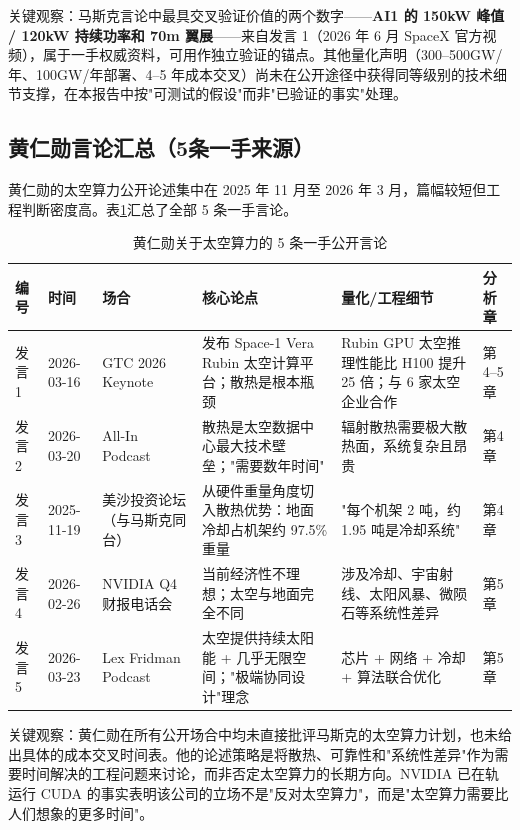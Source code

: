 关键观察：马斯克言论中最具交叉验证价值的两个数字——\textbf{AI1 的 150\;kW 峰值 / 120\;kW 持续功率和 70\;m 翼展}——来自发言 1（2026 年 6 月 SpaceX 官方视频），属于一手权威资料，可用作独立验证的锚点\cite{spacex2026ai1}。其他量化声明（300--500\;GW/年、100\;GW/年部署、4--5 年成本交叉）尚未在公开途径中获得同等级别的技术细节支撑，在本报告中按"可测试的假设"而非"已验证的事实"处理。

\subsection{黄仁勋言论汇总（5条一手来源）}

黄仁勋的太空算力公开论述集中在 2025 年 11 月至 2026 年 3 月，篇幅较短但工程判断密度高。表\ref{tab:huang_statements}汇总了全部 5 条一手言论。

\begin{table}[H]
\centering
\caption{黄仁勋关于太空算力的 5 条一手公开言论}
\label{tab:huang_statements}
\footnotesize
\begin{tabular}{p{0.7cm}p{1.5cm}p{1.5cm}p{3.8cm}p{2.8cm}p{1.2cm}}
\toprule
\textbf{编号} & \textbf{时间} & \textbf{场合} & \textbf{核心论点} & \textbf{量化/工程细节} & \textbf{分析章} \\
\midrule
发言1 & 2026-03-16 & GTC 2026 Keynote & 发布 Space-1 Vera Rubin 太空计算平台；散热是根本瓶颈 & Rubin GPU 太空推理性能比 H100 提升 25 倍；与 6 家太空企业合作 & 第4--5章 \\
\hline
发言2 & 2026-03-20 & All-In Podcast & 散热是太空数据中心最大技术壁垒；"需要数年时间" & 辐射散热需要极大散热面，系统复杂且昂贵 & 第4章 \\
\hline
发言3 & 2025-11-19 & 美沙投资论坛（与马斯克同台） & 从硬件重量角度切入散热优势：地面冷却占机架约 97.5\% 重量 & "每个机架 2 吨，约 1.95 吨是冷却系统" & 第4章 \\
\hline
发言4 & 2026-02-26 & NVIDIA Q4 财报电话会 & 当前经济性不理想；太空与地面完全不同 & 涉及冷却、宇宙射线、太阳风暴、微陨石等系统性差异 & 第5章 \\
\hline
发言5 & 2026-03-23 & Lex Fridman Podcast & 太空提供持续太阳能 + 几乎无限空间；"极端协同设计"理念 & 芯片 + 网络 + 冷却 + 算法联合优化 & 第5章 \\
\bottomrule
\end{tabular}
\end{table}

关键观察：黄仁勋在所有公开场合中均未直接批评马斯克的太空算力计划，也未给出具体的成本交叉时间表。他的论述策略是将散热、可靠性和"系统性差异"作为需要时间解决的工程问题来讨论，而非否定太空算力的长期方向。NVIDIA 已在轨运行 CUDA 的事实表明该公司的立场不是"反对太空算力"，而是"太空算力需要比人们想象的更多时间"。


